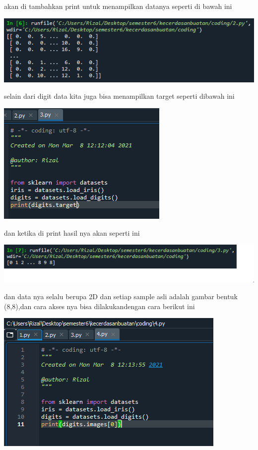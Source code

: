 \documentclass{article}
\begin{document}
akan di tambahkan print untuk menampilkan datanya seperti di bawah ini
\begin{center}
    \includegraphics[width=.8\textwidth]{figures/1184033/chapter1/5.PNG}
\end{center}

selain dari digit data kita juga bisa menampilkan target seperti dibawah ini

\begin{center}
    \includegraphics[width=.8\textwidth]{figures/1184033/chapter1/6.PNG}
\end{center}

dan ketika di print hasil nya akan seperti ini

\begin{center}
    \includegraphics[width=.8\textwidth]{figures/1184033/chapter1/7.PNG}
\end{center}

dan data nya selalu berupa 2D dan setiap sample asli adalah gambar bentuk (8,8),dan cara akses nya bisa dilakukandengan cara berikut ini
\begin{center}
    \includegraphics[width=.8\textwidth]{figures/1184033/chapter1/8.PNG}
\end{center}
\end{document}
